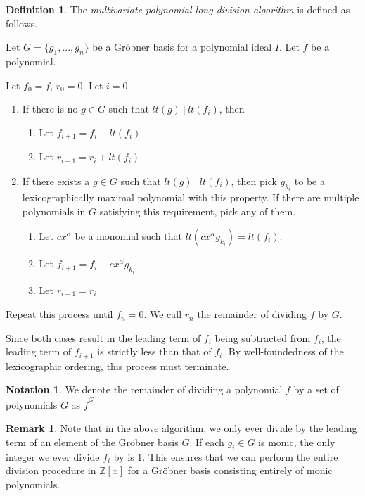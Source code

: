\documentclass{msthesis}
\theoremstyle{definition}
\newtheorem{definition}[theorem]{Definition}
\newtheorem*{notation}{Notation}
\newtheorem*{remark}{Remark}
\newcommand{\ints}{\mathbb{Z}}
\begin{document}
\begin{definition}
The \emph{multivariate polynomial long division algorithm} is defined as follows.

Let $G = \{g_1, ..., g_n\}$ be a Gr\"obner basis for a polynomial ideal $I$.  Let $f$ be a polynomial. 

Let $f_0= f$, $r_0 = 0$. Let $i = 0$
\begin{enumerate}[nosep]
    \item If there is no $g \in G$ such that  $lt(g)\ |\ lt(f_i)$, then
    \begin{enumerate}[nosep]
        \item Let $f_{i+1} = f_i - lt(f_i)$
        \item Let $r_{i+1} = r_i + lt(f_i)$
    \end{enumerate}
    \item If there exists a $g \in G$ such that $lt(g)\ |\ lt(f_i)$, then pick $g_{k_i}$ to be a lexicographically maximal polynomial with this property.  If there are multiple polynomials in $G$ satisfying this requirement, pick any of them.
    \begin{enumerate}[nosep]
        \item Let $cx^\alpha$ be a monomial such that $lt(cx^\alpha g_{k_i}) = lt(f_i)$.
        \item Let $f_{i+1} = f_i - cx^\alpha g_{k_i}$
        \item Let $r_{i+1} = r_i$ 
    \end{enumerate} 
\end{enumerate}
Repeat this process until $f_n = 0$.  We call $r_n$ the remainder of dividing $f$ by $G$.

Since both cases result in the leading term of $f_i$ being subtracted from $f_i$, the leading term of $f_{i+1}$  is strictly less than that of $f_{i}$.  By well-foundedness of the lexicographic ordering, this process must terminate.
\end{definition}

\begin{notation}
    We denote the remainder of dividing a polynomial $f$ by a set of polynomials $G$ as $\overline{f}^G$
\end{notation}

\begin{remark}
    Note that in the above algorithm, we only ever divide by the leading term of an element of the Gr\"obner basis $G$.  If each $g_i \in G$ is monic, the only integer we ever divide $f_i$ by is $1$. This ensures that we can perform the entire division procedure in $\ints[\bar{x}]$ for a Gr\"obner basis consisting entirely of monic polynomials.
\end{remark}
\end{document}
